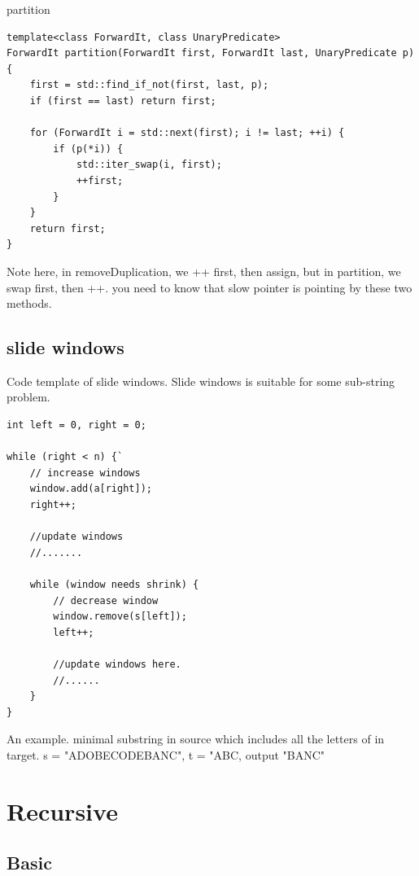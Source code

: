 \documentclass[a4paper,11pt,twoside]{book}
\begin{document}
	\par partition
\begin{lstlisting}[breaklines]
template<class ForwardIt, class UnaryPredicate>
ForwardIt partition(ForwardIt first, ForwardIt last, UnaryPredicate p)
{
	first = std::find_if_not(first, last, p);
	if (first == last) return first;
	
	for (ForwardIt i = std::next(first); i != last; ++i) {
		if (p(*i)) {
			std::iter_swap(i, first);
			++first;
		}
	}
	return first;
}
\end{lstlisting}

	\par Note here, in removeDuplication, we ++ first, then assign, but in partition, we swap first, then ++. you need to know that slow pointer is pointing by these two methods. 

	

\subsection{slide windows}

	\par Code template of slide windows. Slide windows is suitable for some sub-string problem. 

\begin{lstlisting}[breaklines]
int left = 0, right = 0;

while (right < n) {`
	// increase windows
	window.add(a[right]);
	right++;
	
	//update windows
	//.......
	
	while (window needs shrink) {
		// decrease window
		window.remove(s[left]);
		left++;
		
		//update windows here.
		//......
	}
}			
\end{lstlisting}

	\par An example. minimal substring in source which includes all the letters of in target.
	s = "ADOBECODEBANC", t = "ABC, output "BANC"
	

\section{Recursive}
\subsection{Basic}
\end{document}
